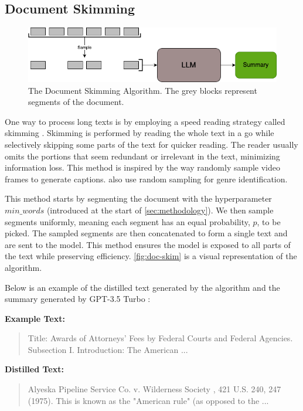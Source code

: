 \subsection{Document Skimming}
\label{method:skimming}

\begin{figure}[!ht]
  \centering
  \includegraphics[width=.8\textwidth]{images/doc-skim.png}
  \caption{The Document Skimming Algorithm. The grey blocks represent segments of the document.}
  \label{fig:doc-skim}
\end{figure}

One way to process long texts is by employing a speed reading strategy called skimming \cite{dhillon2020effect}.
Skimming is performed by reading the whole text in a go while selectively skipping some parts of the text for quicker reading.
The reader usually omits the portions that seem redundant or irrelevant in the text, minimizing information loss.
This method is inspired by the way \citet{wang2024videoagent} randomly sample video frames to generate captions.
\citet{worsham-kalita-2018-genre} also use random sampling for genre identification.

This method starts by segmenting the document with the hyperparameter $min\_words$ (introduced at the start of \autoref{sec:methodology}).
We then sample segments uniformly, meaning each segment has an equal probability, $p$, to be picked.
The sampled segments are then concatenated to form a single text and are sent to the model.
This method ensures the model is exposed to all parts of the text while preserving efficiency.
\autoref{fig:doc-skim} is a visual representation of the algorithm.

Below is an example of the distilled text generated by the algorithm and the summary generated by GPT-3.5 Turbo \cite{brown2020language}:

\noindent \textbf{Example Text:}
\begin{quote}
  Title: Awards of Attorneys’ Fees by Federal Courts and Federal Agencies.
  Subsection I. Introduction: The American ...
\end{quote}

\noindent \textbf{Distilled Text:}
\begin{quote}
  Alyeska Pipeline Service Co. v. Wilderness Society , 421 U.S. 240, 247 (1975). This is known as the "American rule" (as opposed to the ...
\end{quote}

